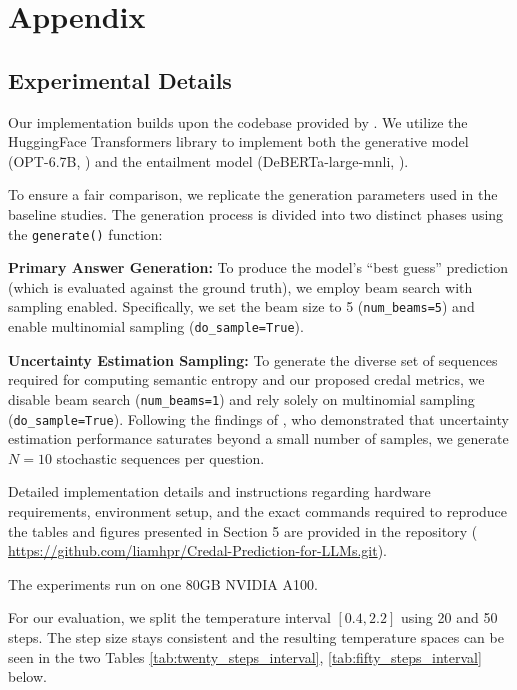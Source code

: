 %
\chapter{Appendix}
\label{sec:appendix}

\section{Experimental Details}
\label{sec:appendix:exp_details}

Our implementation builds upon the codebase provided by 
\textcite{kuhn2023semanticuncertaintylinguisticinvariances}. 
We utilize the HuggingFace Transformers library to implement 
both the generative model (OPT-6.7B, \citealp{zhang2022opt}) and the 
entailment model (DeBERTa-large-mnli, 
\citealp{he2021debertadecodingenhancedbertdisentangled}).

To ensure a fair comparison, we replicate the generation parameters 
used in the baseline studies. The generation process is divided into 
two distinct phases using the \texttt{generate()} function:

\textbf{Primary Answer Generation:}
To produce the model's ``best guess'' prediction 
(which is evaluated against the ground truth), we employ beam search 
with sampling enabled. Specifically, we set the beam size to 5 
(\texttt{num\_beams=5}) and enable multinomial sampling 
(\texttt{do\_sample=True}).

\textbf{Uncertainty Estimation Sampling:}
To generate the diverse set of sequences required for computing 
semantic entropy and our proposed credal metrics, we disable beam 
search (\texttt{num\_beams=1}) and rely solely on multinomial sampling 
(\texttt{do\_sample=True}). Following the findings of 
\textcite{kuhn2023semanticuncertaintylinguisticinvariances}, 
who demonstrated that uncertainty estimation performance saturates 
beyond a small number of samples, we generate $N=10$ stochastic 
sequences per question.

Detailed implementation details and instructions regarding hardware 
requirements, environment setup,
and the exact commands required to reproduce the tables and figures
presented in Section 5 are provided in the repository (
\url{https://github.com/liamhpr/Credal-Prediction-for-LLMs.git}).

The experiments run on one 80GB NVIDIA A100.



For our evaluation, we split the temperature interval $[0.4, 2.2]$ using
20 and 50 steps. The step size stays consistent and the resulting 
temperature spaces can be seen in the two Tables 
\ref{tab:twenty_steps_interval}, \ref{tab:fifty_steps_interval} below.


